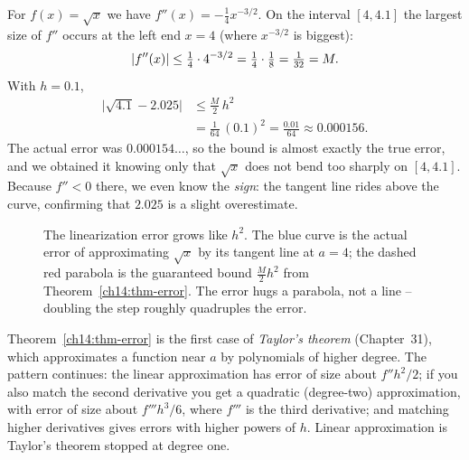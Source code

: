 \begin{example}
\label{ch14:ex-sqrt-bound}
For $f(x)=\sqrt{x}$ we have $f''(x) = -\tfrac14 x^{-3/2}$. On the interval
$[4,4.1]$ the largest size of $f''$ occurs at the left end $x=4$ (where
$x^{-3/2}$ is biggest):
\[
\lvert f''(x)\rvert \le \tfrac14 \cdot 4^{-3/2} = \tfrac14\cdot \tfrac18 = \tfrac{1}{32}
= M.
\]
With $h = 0.1$,
\begin{align*}
\bigl|\sqrt{4.1}-2.025\bigr| &\le \frac{M}{2}\,h^2\\
&= \frac{1}{64}\,(0.1)^2 = \frac{0.01}{64} \approx 0.000156.
\end{align*}
The actual error was $0.000154\ldots$, so the bound is almost exactly the true
error, and we obtained it knowing only that $\sqrt{x}$ does not bend too sharply on $[4,4.1]$.
Because $f''<0$ there, we even know the \emph{sign}: the tangent line rides above the
curve, confirming that $2.025$ is a slight overestimate.
\end{example}

\begin{figure}[H]
\centering
{}
\caption{The linearization error grows like $h^2$. The blue curve is the actual
error of approximating $\sqrt{x}$ by its tangent line at $a=4$; the dashed red
parabola is the guaranteed bound $\tfrac{M}{2}h^2$ from
Theorem~\ref{ch14:thm-error}. The error hugs a parabola, not a line -- doubling
the step roughly quadruples the error.}
\label{ch14:fig-errgrow}
\end{figure}

\begin{aestheticbox}
Theorem~\ref{ch14:thm-error} is the first case of \emph{Taylor's theorem}
(Chapter~31), which approximates a function near $a$ by polynomials of higher
degree. The pattern continues:
the linear approximation has error of size about $f'' h^2/2$; if you also match
the second derivative you get a quadratic (degree-two) approximation, with error of
size about $f''' h^3/6$, where $f'''$ is the third derivative;
and matching higher derivatives gives errors with higher powers of $h$. Linear
approximation is Taylor's theorem stopped at degree one.
\end{aestheticbox}

